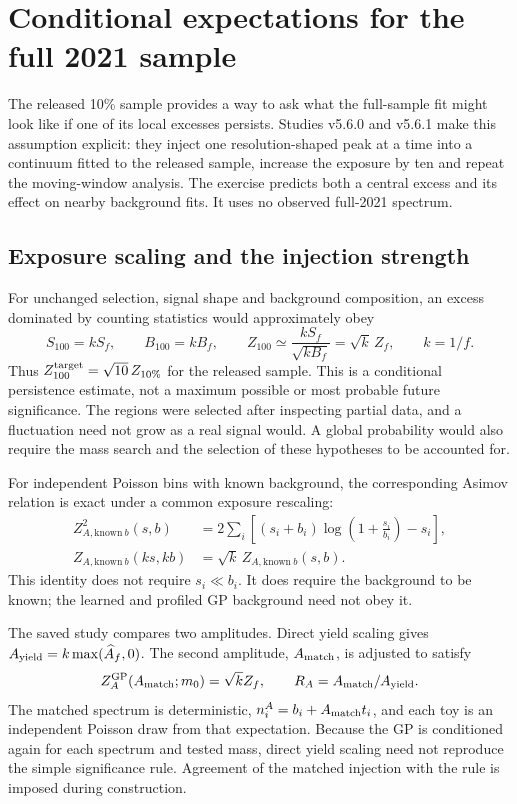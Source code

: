 \section{Conditional expectations for the full 2021 sample}
\label{sec:v505-projections}
The released 10\% sample provides a way to ask what the full-sample fit might
look like if one of its local excesses persists. Studies v5.6.0 and v5.6.1
make this assumption explicit: they inject one resolution-shaped peak at a
time into a continuum fitted to the released sample, increase the exposure
by ten and repeat the moving-window analysis. The exercise predicts both a
central excess and its effect on nearby background fits. It uses no observed
full-2021 spectrum.

\subsection{Exposure scaling and the injection strength}
For unchanged selection, signal shape and background composition, an excess
dominated by counting statistics would approximately obey
\begin{equation}
 S_{100}=kS_f,\qquad B_{100}=kB_f,\qquad
 Z_{100}\simeq\frac{kS_f}{\sqrt{kB_f}}=\sqrt{k}\,Z_f,
 \qquad k=1/f.
 \label{eq:v505-scaling}
\end{equation}
Thus $Z_{100}^{\rm target}=\sqrt{10}\,Z_{10\%}$ for the released sample.
This is a conditional persistence estimate, not a maximum possible or most
probable future significance. The regions were selected after inspecting
partial data, and a fluctuation need not grow as a real signal would.
A global probability would also require the mass search and the selection
of these hypotheses to be accounted for.

For independent Poisson bins with known background, the corresponding
Asimov relation is exact under a common exposure rescaling:
\begin{align}
 Z_{A,\mathrm{known}\ b}^2(s,b)
 &=2\sum_i\left[(s_i+b_i)\log\left(1+\frac{s_i}{b_i}\right)-s_i\right],\\
 Z_{A,\mathrm{known}\ b}(ks,kb)&=\sqrt{k}\,Z_{A,\mathrm{known}\ b}(s,b).
\end{align}
This identity does not require $s_i\ll b_i$. It does require the background
to be known; the learned and profiled GP background need not obey it.

The saved study compares two amplitudes. Direct yield scaling gives
$A_{\rm yield}=k\max(\widehat A_f,0)$. The second amplitude, $A_{\rm match}$,
is adjusted to satisfy
\begin{equation}
 Z_A^{\rm GP}(A_{\rm match};m_0)=\sqrt{k}Z_f,\qquad
 R_A=A_{\rm match}/A_{\rm yield}.
\end{equation} The matched spectrum is deterministic,
$n_i^A=b_i+A_{\rm match}t_i$, and each toy is an independent Poisson draw
from that expectation. Because the GP is conditioned again for each
spectrum and tested mass, direct yield scaling need not reproduce the
simple significance rule. Agreement of the matched injection with the
rule is imposed during construction.

